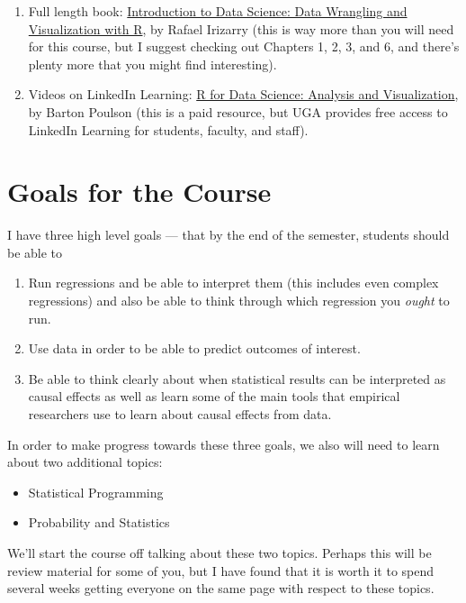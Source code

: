 \documentclass[
  letterpaper,
  DIV=11,
  numbers=noendperiod]{scrreprt}
\begin{document}
\begin{enumerate}
\def\labelenumi{\arabic{enumi}.}
\item
  Full length book:
  \href{https://rafalab.dfci.harvard.edu/dsbook-part-1/}{Introduction to
  Data Science: Data Wrangling and Visualization with R}, by Rafael
  Irizarry (this is way more than you will need for this course, but I
  suggest checking out Chapters 1, 2, 3, and 6, and there's plenty more
  that you might find interesting).
\item
  Videos on LinkedIn Learning:
  \href{https://www.linkedin.com/learning/r-for-data-science-analysis-and-visualization/}{R
  for Data Science: Analysis and Visualization}, by Barton Poulson (this
  is a paid resource, but UGA provides free access to LinkedIn Learning
  for students, faculty, and staff).
\end{enumerate}

\section{Goals for the Course}\label{goals-for-the-course}

I have three high level goals --- that by the end of the semester,
students should be able to

\begin{enumerate}
\def\labelenumi{\arabic{enumi}.}
\item
  Run regressions and be able to interpret them (this includes even
  complex regressions) and also be able to think through which
  regression you \emph{ought} to run.
\item
  Use data in order to be able to predict outcomes of interest.
\item
  Be able to think clearly about when statistical results can be
  interpreted as causal effects as well as learn some of the main tools
  that empirical researchers use to learn about causal effects from
  data.
\end{enumerate}

In order to make progress towards these three goals, we also will need
to learn about two additional topics:

\begin{itemize}
\item
  Statistical Programming
\item
  Probability and Statistics
\end{itemize}

We'll start the course off talking about these two topics. Perhaps this
will be review material for some of you, but I have found that it is
worth it to spend several weeks getting everyone on the same page with
respect to these topics.
\end{document}

